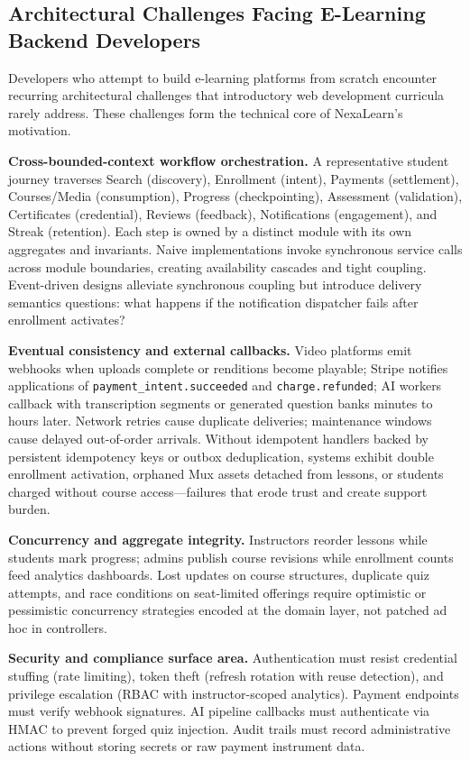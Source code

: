 \subsection{Architectural Challenges Facing E-Learning Backend Developers}
\label{subsec:architectural-challenges}

Developers who attempt to build e-learning platforms from scratch encounter recurring architectural challenges that introductory web development curricula rarely address. These challenges form the technical core of NexaLearn's motivation.

\textbf{Cross-bounded-context workflow orchestration.} A representative student journey traverses Search (discovery), Enrollment (intent), Payments (settlement), Courses/Media (consumption), Progress (checkpointing), Assessment (validation), Certificates (credential), Reviews (feedback), Notifications (engagement), and Streak (retention). Each step is owned by a distinct module with its own aggregates and invariants. Naive implementations invoke synchronous service calls across module boundaries, creating availability cascades and tight coupling. Event-driven designs alleviate synchronous coupling but introduce delivery semantics questions: what happens if the notification dispatcher fails after enrollment activates?

\textbf{Eventual consistency and external callbacks.} Video platforms emit webhooks when uploads complete or renditions become playable; Stripe notifies applications of \texttt{payment\_intent.succeeded} and \texttt{charge.refunded}; AI workers callback with transcription segments or generated question banks minutes to hours later. Network retries cause duplicate deliveries; maintenance windows cause delayed out-of-order arrivals. Without idempotent handlers backed by persistent idempotency keys or outbox deduplication, systems exhibit double enrollment activation, orphaned Mux assets detached from lessons, or students charged without course access---failures that erode trust and create support burden.

\textbf{Concurrency and aggregate integrity.} Instructors reorder lessons while students mark progress; admins publish course revisions while enrollment counts feed analytics dashboards. Lost updates on course structures, duplicate quiz attempts, and race conditions on seat-limited offerings require optimistic or pessimistic concurrency strategies encoded at the domain layer, not patched ad hoc in controllers.

\textbf{Security and compliance surface area.} Authentication must resist credential stuffing (rate limiting), token theft (refresh rotation with reuse detection), and privilege escalation (RBAC with instructor-scoped analytics). Payment endpoints must verify webhook signatures. AI pipeline callbacks must authenticate via HMAC to prevent forged quiz injection. Audit trails must record administrative actions without storing secrets or raw payment instrument data.

